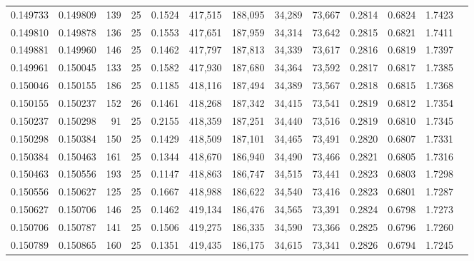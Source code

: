 \begin{tabular}{rrrrrrrrrrrrr}
0.149733 & 0.149809 &   139 &  25 &                                     0.1524 & 417,515 & 188,095 &  34,289 &  73,667 & 0.2814 & 0.6824 & 1.7423 \\
0.149810 & 0.149878 &   136 &  25 &                                     0.1553 & 417,651 & 187,959 &  34,314 &  73,642 & 0.2815 & 0.6821 & 1.7411 \\
0.149881 & 0.149960 &   146 &  25 &                                     0.1462 & 417,797 & 187,813 &  34,339 &  73,617 & 0.2816 & 0.6819 & 1.7397 \\
0.149961 & 0.150045 &   133 &  25 &                                     0.1582 & 417,930 & 187,680 &  34,364 &  73,592 & 0.2817 & 0.6817 & 1.7385 \\
0.150046 & 0.150155 &   186 &  25 &                                     0.1185 & 418,116 & 187,494 &  34,389 &  73,567 & 0.2818 & 0.6815 & 1.7368 \\
0.150155 & 0.150237 &   152 &  26 &                                     0.1461 & 418,268 & 187,342 &  34,415 &  73,541 & 0.2819 & 0.6812 & 1.7354 \\
0.150237 & 0.150298 &    91 &  25 &                                     0.2155 & 418,359 & 187,251 &  34,440 &  73,516 & 0.2819 & 0.6810 & 1.7345 \\
0.150298 & 0.150384 &   150 &  25 &                                     0.1429 & 418,509 & 187,101 &  34,465 &  73,491 & 0.2820 & 0.6807 & 1.7331 \\
0.150384 & 0.150463 &   161 &  25 &                                     0.1344 & 418,670 & 186,940 &  34,490 &  73,466 & 0.2821 & 0.6805 & 1.7316 \\
0.150463 & 0.150556 &   193 &  25 &                                     0.1147 & 418,863 & 186,747 &  34,515 &  73,441 & 0.2823 & 0.6803 & 1.7298 \\
0.150556 & 0.150627 &   125 &  25 &                                     0.1667 & 418,988 & 186,622 &  34,540 &  73,416 & 0.2823 & 0.6801 & 1.7287 \\
0.150627 & 0.150706 &   146 &  25 &                                     0.1462 & 419,134 & 186,476 &  34,565 &  73,391 & 0.2824 & 0.6798 & 1.7273 \\
0.150706 & 0.150787 &   141 &  25 &                                     0.1506 & 419,275 & 186,335 &  34,590 &  73,366 & 0.2825 & 0.6796 & 1.7260 \\
0.150789 & 0.150865 &   160 &  25 &                                     0.1351 & 419,435 & 186,175 &  34,615 &  73,341 & 0.2826 & 0.6794 & 1.7245 \\

\end{tabular}
